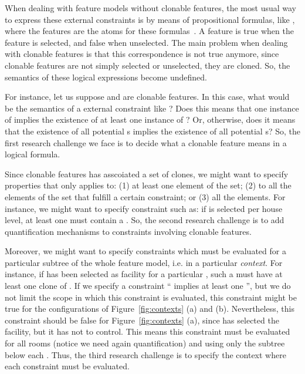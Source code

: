 When dealing with feature models without clonable features, the most usual way to express these external constraints is by means of propositional formulas, like , where the features are the atoms for these formulas~\cite{batory:2005}. A feature is true when the feature is selected, and false when unselected. The main problem when dealing with clonable features is that this correspondence is not true anymore, since clonable features are not simply selected or unselected, they are cloned. So, the semantics of these logical expressions become undefined.

For instance, let us suppose   and  are clonable features. In this case, what would be the semantics of a external constraint like ? Does this means that one instance of  implies the existence of at least one instance of ? Or, otherwise, does it means that the existence of all potential s implies the existence of all potential s? So, the first research challenge we face is to decide what a clonable feature means in a logical formula.


Since clonable features has asscoiated a set of clones, we might want to specify properties that only applies to: (1) at least one element of the set; (2) to all the elements of the set that fulfill a certain constraint; or (3) all the elements. For instance, we might want to specify constraint such as: if  is selected per house level, at least one  must contain a . So, the second research challenge is to add quantification mechanisms to constraints involving clonable features.

Moreover, we might want to specify constraints which must be evaluated for a particular subtree of the whole feature model, i.e. in a particular \emph{context}. For instance, if  has been selected as facility for a particular , such a  must have at least one clone of . If we specify a constraint `` implies at least one '', but we do not limit the scope in which this constraint is evaluated, this constraint might be true for the configurations of Figure~\ref{fig:contexts} (a) and (b). Nevertheless, this constraint should be false for Figure~\ref{fig:contexts} (a), since  has selected the  facility, but it has not  to control. This means this constraint must be evaluated for all rooms (notice we need again quantification) and using only the subtree below each . Thus, the third research challenge is to specify the context where each constraint must be evaluated. 

